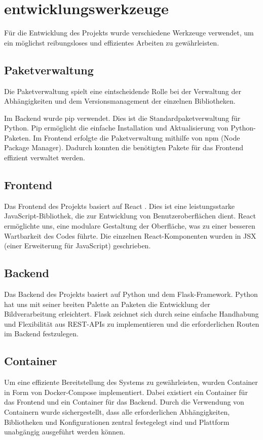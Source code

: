 \section{entwicklungswerkzeuge}
Für die Entwicklung des Projekts wurde verschiedene Werkzeuge verwendet, um ein möglichst reibungsloses und effizientes Arbeiten zu gewährleisten.

\subsection{Paketverwaltung}
Die Paketverwaltung spielt eine eintscheidende Rolle bei der Verwaltung der Abhängigkeiten und dem Versionsmanagement der einzelnen Bibliotheken.

Im Backend wurde \glqq{}pip\grqq{} verwendet. Dies ist die Standardpaketverwaltung für Python. \glqq{}Pip\grqq{} ermöglicht die einfache Installation und Aktualisierung von Python-Paketen. Im Frontend erfolgte die Paketverwaltung mithilfe von  \glqq{}npm\grqq{} (Node Package Manager). Dadurch konnten die benötigten Pakete für das Frontend effizient verwaltet werden.

\subsection{Frontend}
Das Frontend des Projekts basiert auf React \cite{react}. Dies ist eine leistungsstarke JavaScript-Bibliothek, die zur Entwicklung von Benutzeroberflächen dient. React ermöglichte uns, eine modulare Gestaltung der Oberfläche, was zu einer besseren Wartbarkeit des Codes führte. Die einzelnen React-Komponenten wurden in JSX (einer Erweiterung für JavaScript) geschrieben. 

\subsection{Backend}
Das Backend des Projekts basiert auf Python und dem Flask-Framework. Python hat uns mit seiner breiten Palette an Paketen die Entwicklung der Bildverarbeitung erleichtert. Flask zeichnet sich durch seine einfache Handhabung und Flexibilität aus REST-APIs zu implementieren und die erforderlichen Routen im Backend festzulegen.

\subsection{Container}
Um eine effiziente Bereitstellung des Systems zu gewährleisten, wurden Container in Form von Docker-Compose \cite{docker} implementiert. Dabei existiert ein Container für das Frontend und ein Container für das Backend. Durch die Verwendung von Containern wurde sichergestellt, dass alle erforderlichen Abhängigkeiten, Bibliotheken und Konfigurationen zentral festegelegt sind und Plattform unabgängig ausgeführt werden können.